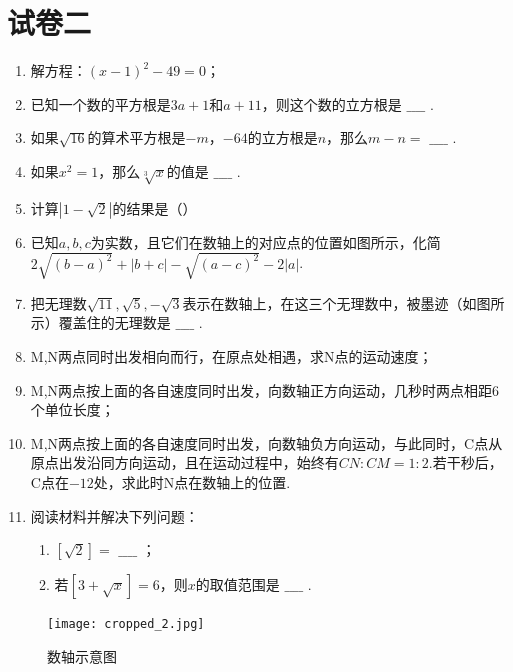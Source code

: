 \documentclass[12pt]{ctexart}
\begin{document}
\newpage

\section*{试卷二}
\begin{enumerate}[label=\arabic*.]
    \item 解方程：$(x-1)^2-49=0$；
    \item 已知一个数的平方根是$3a+1$和$a+11$，则这个数的立方根是 $\_\_\_\_$ .
    \item 如果$\sqrt{16}$的算术平方根是$-m$，$-64$的立方根是$n$，那么$m-n=$ $\_\_\_\_$ .
    \item 如果$x^2=1$，那么$\sqrt[3]{x}$的值是 $\_\_\_\_$ .
    \item 计算$|1-\sqrt{2}|$的结果是（）
    \item 已知$a,b,c$为实数，且它们在数轴上的对应点的位置如图所示，化简$2\sqrt{(b-a)^2}+|b+c|-\sqrt{(a-c)^2}-2|a|$.
    \item 把无理数$\sqrt{11},\sqrt{5},-\sqrt{3}$表示在数轴上，在这三个无理数中，被墨迹（如图所示）覆盖住的无理数是 $\_\_\_\_$ .
    \item M,N两点同时出发相向而行，在原点处相遇，求N点的运动速度；
    \item M,N两点按上面的各自速度同时出发，向数轴正方向运动，几秒时两点相距6个单位长度；
    \item M,N两点按上面的各自速度同时出发，向数轴负方向运动，与此同时，C点从原点出发沿同方向运动，且在运动过程中，始终有$CN:CM=1:2$.若干秒后，C点在$-12$处，求此时N点在数轴上的位置.
    \item 阅读材料并解决下列问题：
        \begin{enumerate}
            \item $[\sqrt{2}]=$ $\_\_\_\_$ ；
            \item 若$[3+\sqrt{x}]=6$，则$x$的取值范围是 $\_\_\_\_$ .
        \end{enumerate}
\end{enumerate}

\begin{figure}[H]
    \centering
    \texttt{[image: cropped\_2.jpg]}
    \caption{数轴示意图}
\end{figure}

\newpage
\end{document}
